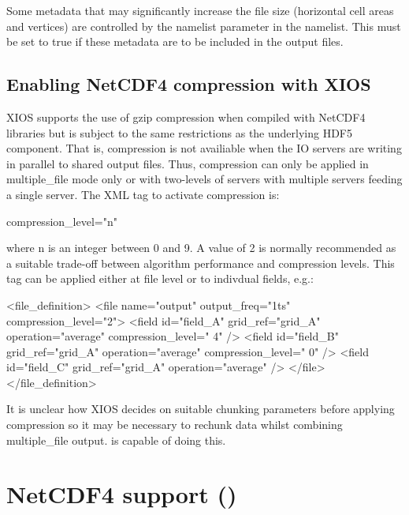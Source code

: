 \documentclass[../main/NEMO_manual]{subfiles}
\begin{document}
Some metadata that may significantly increase the file size (horizontal cell areas and vertices) are controlled by
the namelist parameter  in the  namelist.
This must be set to true if these metadata are to be included in the output files.

\subsection{Enabling NetCDF4 compression with XIOS}

XIOS supports the use of gzip compression when compiled with NetCDF4 libraries but is subject to the
same restrictions as the underlying HDF5 component. That is, compression is not availiable when the
IO servers are writing in parallel to shared output files. Thus, compression can only be applied in
multiple\_file mode only or with two-levels of servers with multiple servers feeding a single server.
The XML tag to activate compression is:

\begin{xmllines}
   compression_level="n"
\end{xmllines}

where n is an integer between 0 and 9. A value of 2 is normally recommended as a suitable trade-off between
algorithm performance and compression levels. This tag can be applied either at file level or to indivdual
fields, e.g.:

\begin{xmllines}
   <file_definition>
      <file name="output" output_freq="1ts" compression_level="2">
         <field id="field_A" grid_ref="grid_A" operation="average" compression_level=" 4" />
         <field id="field_B" grid_ref="grid_A" operation="average" compression_level=" 0" />
         <field id="field_C" grid_ref="grid_A" operation="average" />
      </file> 
   </file_definition>
\end{xmllines}

It is unclear how XIOS decides on suitable chunking parameters before applying compression so it may
be necessary to rechunk data whilst combining multiple\_file output.  is capable
of doing this.

\section[NetCDF4 support (\texttt{\textbf{key\_netcdf4}})]{NetCDF4 support (\protect{})}
\label{sec:DIA_nc4}
\end{document}
